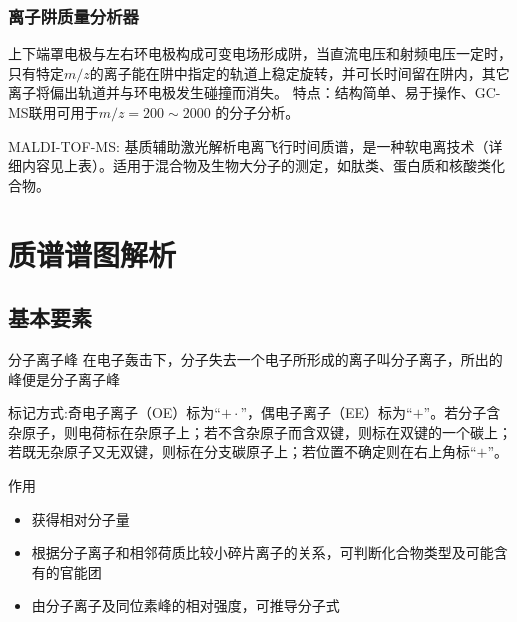 \subsubsection*{离子阱质量分析器}
上下端罩电极与左右环电极构成可变电场形成阱，当直流电压和射频电压一定时，只有特定$m/z$的离子能在阱中指定的轨道上稳定旋转，并可长时间留在阱内，其它离子将偏出轨道并与环电极发生碰撞而消失。
特点：结构简单、易于操作、GC-MS联用可用于$m/z=200\sim 2000$ 的分子分析。

\begin{definition*}{MALDI-TOF-MS:}
    基质辅助激光解析电离飞行时间质谱，是一种软电离技术（详细内容见上表）。适用于混合物及生物大分子的测定，如肽类、蛋白质和核酸类化合物。
\end{definition*}

\section{质谱谱图解析}
\subsection{基本要素}
\begin{definition*}{分子离子峰}
    在电子轰击下，分子失去一个电子所形成的离子叫分子离子，所出的峰便是分子离子峰
\end{definition*}
\begin{note}
    标记方式:奇电子离子（OE）标为“$+\cdot$”，偶电子离子（EE）标为“$+$”。若分子含杂原子，则电荷标在杂原子上；若不含杂原子而含双键，则标在双键的一个碳上；若既无杂原子又无双键，则标在分支碳原子上；若位置不确定则在右上角标“$+$”。
\end{note}

作用
\begin{itemize}
    \item 获得相对分子量
    \item 根据分子离子和相邻荷质比较小碎片离子的关系，可判断化合物类型及可能含有的官能团
    \item 由分子离子及同位素峰的相对强度，可推导分子式
\end{itemize}

